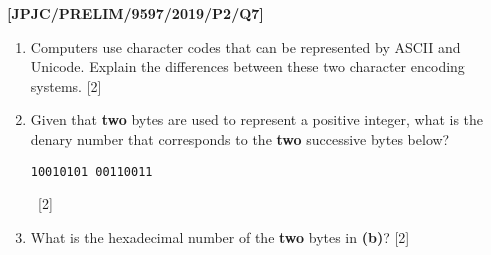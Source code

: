 \item \textbf{{[}JPJC/PRELIM/9597/2019/P2/Q7{]} }
\begin{enumerate}
\item Computers use character codes that can be represented by ASCII and
Unicode. Explain the differences between these two character encoding
systems. \hfill{}{[}2{]}
\item Given that \textbf{two} bytes are used to represent a positive integer,
what is the denary number that corresponds to the \textbf{two} successive
bytes below? 
\noindent \begin{center}
\texttt{10010101 00110011} 
\par\end{center}

\noindent \begin{center}
\hfill{}\texttt{ }{[}2{]}
\par\end{center}
\item What is the hexadecimal number of the \textbf{two} bytes in \textbf{(b)}?
\hfill{} {[}2{]}
\end{enumerate}